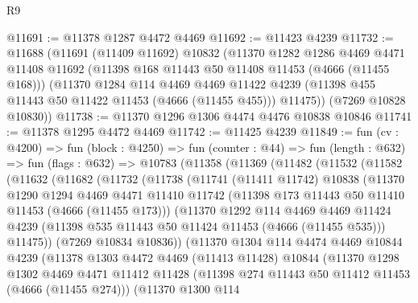 \begin{lexlean}{R9}
\begin{coremodule}
@11691 := @11378 @1287 @4472 @4469
@11692 := @11423 @4239
@11732 := @11688
    (@11691
      (@11409 @11692)
      @10832
      (@11370
        @1282
        @1286
        @4469
        @4471
        @11408
        @11692
        (@11398 @168 @11443 @50 @11408 @11453 (@4666 (@11455 @168)))
        (@11370
          @1284
          @114
          @4469
          @4469
          @11422
          @4239
          (@11398 @455 @11443 @50 @11422 @11453 (@4666 (@11455 @455)))
          @11475))
      (@7269 @10828 @10830))
@11738 := @11370 @1296 @1306 @4474 @4476 @10838 @10846
@11741 := @11378 @1295 @4472 @4469
@11742 := @11425 @4239
@11849 := fun (cv : @4200) =>
  fun (block : @4250) =>
  fun (counter : @44) =>
  fun (length : @632) =>
  fun (flags : @632) =>
  @10783
    (@11358
      (@11369
        (@11482
          (@11532
            (@11582
              (@11632
                (@11682
                  (@11732
                    (@11738
                      (@11741
                        (@11411 @11742)
                        @10838
                        (@11370
                          @1290
                          @1294
                          @4469
                          @4471
                          @11410
                          @11742
                          (@11398 @173 @11443 @50 @11410 @11453 (@4666 (@11455 @173)))
                          (@11370
                            @1292
                            @114
                            @4469
                            @4469
                            @11424
                            @4239
                            (@11398 @535 @11443 @50 @11424 @11453 (@4666 (@11455 @535)))
                            @11475))
                        (@7269 @10834 @10836))
                      (@11370
                        @1304
                        @114
                        @4474
                        @4469
                        @10844
                        @4239
                        (@11378
                          @1303
                          @4472
                          @4469
                          (@11413 @11428)
                          @10844
                          (@11370
                            @1298
                            @1302
                            @4469
                            @4471
                            @11412
                            @11428
                            (@11398 @274 @11443 @50 @11412 @11453 (@4666 (@11455 @274)))
                            (@11370
                              @1300
                              @114

\end{coremodule}
\end{lexlean}
